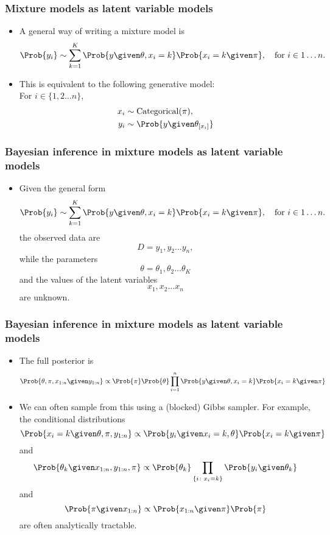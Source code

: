 \documentclass{slides}
\begin{document}
	\begin{frame}
	\frametitle{Mixture models as latent variable models}
	\begin{itemize}
	\item A general way of writing a mixture model is 
		\[
			\Prob{y_i} \sim \sum_{k=1}^K \Prob{y \given \theta, x_i=k}\Prob{x_i=k\given\pi}, \quad\text{for $i \in {1 \ldots n}$.}
		\]
	\item This is equivalent to the following generative model: \\
		For $i \in \{1, 2 \ldots n\}$,
		\begin{align*}
			x_i &\sim \mathrm{Categorical}(\pi),\\
			y_i &\sim \Prob{y\given \theta_{[x_i]}}
		\end{align*}
	\end{itemize}
	\end{frame}


	\begin{frame}
	\frametitle{Bayesian inference in mixture models as latent variable models}
	\begin{itemize}
	\item Given the general form
		\[
			\Prob{y_i} \sim \sum_{k=1}^K \Prob{y \given \theta, x_i=k}\Prob{x_i=k\given\pi}, \quad\text{for $i \in {1 \ldots n}$.}
		\]
		the observed data are\[ D = y_1, y_2 \ldots y_n,\] 
		while the parameters 
		\[\theta = \theta_1, \theta_2 \ldots \theta_K\]
		and the values of the latent variables \[x_1, x_2 \ldots x_n\] are unknown.
	\end{itemize}
	\end{frame}


	\begin{frame}
	\frametitle{Bayesian inference in mixture models as latent variable models}
	\begin{itemize}
		\item The full posterior is \[
		\Prob{\theta, \pi, x_{1:n} \given y_{1:n}} \propto \Prob{\pi}\Prob{\theta}\prod_{i=1}^n \Prob{y \given \theta, x_i=k}\Prob{x_i=k\given\pi}
		\]
	\item We can often sample from this using a (blocked) Gibbs sampler. For example, the conditional distributions 
		\[
			\Prob{x_i = k \given \theta, \pi, y_{1:n}} \propto 
			\Prob{y_i \given x_i=k, \theta}\Prob{x_i = k \given \pi}
		\]
		and \[
			\Prob{\theta_k \given x_{1:n}, y_{1:n}, \pi} \propto \Prob{\theta_k} \prod_{\{i \colon x_i=k\}}\Prob{y_i \given \theta_k}
		\]
		and \[
			\Prob{\pi\given x_{1:n}} \propto \Prob{x_{1:n}\given \pi}\Prob{\pi}
		\]
		are often analytically tractable.
	\end{itemize}
	\end{frame}
\end{document}
